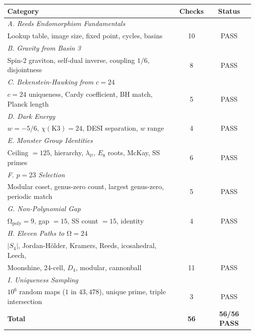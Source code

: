 \documentclass[12pt,a4paper]{article}
\theoremstyle{definition}\newtheorem{definition}[theorem]{Definition}
\theoremstyle{remark}\newtheorem{remark}[theorem]{Remark}
\renewcommand{\O}{\mathrm{\Omega}}
\newcommand{\Monster}{\mathbb{M}}\newcommand{\Leech}{\Lambda_{24}}
\begin{document}
\begin{center}
\small
\begin{tabular}{lcc}
\toprule
\textbf{Category} & \textbf{Checks} & \textbf{Status} \\
\midrule
\multicolumn{3}{l}{\emph{A. Reeds Endomorphism Fundamentals}} \\
\quad Lookup table, image size, fixed point, cycles, basins & 10 & \textcolor{proved}{PASS} \\
\midrule
\multicolumn{3}{l}{\emph{B. Gravity from Basin 3}} \\
\quad Spin-2 graviton, self-dual inverse, coupling $1/6$, disjointness & 8 & \textcolor{proved}{PASS} \\
\midrule
\multicolumn{3}{l}{\emph{C. Bekenstein-Hawking from $c = 24$}} \\
\quad $c = 24$ uniqueness, Cardy coefficient, BH match, Planck length & 5 & \textcolor{proved}{PASS} \\
\midrule
\multicolumn{3}{l}{\emph{D. Dark Energy}} \\
\quad $w = -5/6$, $\chi(\mathrm{K3}) = 24$, DESI separation, $w$ range & 4 & \textcolor{proved}{PASS} \\
\midrule
\multicolumn{3}{l}{\emph{E. Monster Group Identities}} \\
\quad Ceiling $= 125$, hierarchy, $\lambda_\Monster$, $E_8$ roots, McKay, SS primes & 6 & \textcolor{proved}{PASS} \\
\midrule
\multicolumn{3}{l}{\emph{F. $p = 23$ Selection}} \\
\quad Modular coset, genus-zero count, largest genus-zero, periodic match & 5 & \textcolor{proved}{PASS} \\
\midrule
\multicolumn{3}{l}{\emph{G. Non-Polynomial Gap}} \\
\quad $\O_{\mathrm{poly}} = 9$, gap $= 15$, SS count $= 15$, identity & 4 & \textcolor{proved}{PASS} \\
\midrule
\multicolumn{3}{l}{\emph{H. Eleven Paths to $\O = 24$}} \\
\quad $|S_4|$, Jordan-H\"older, Kramers, Reeds, icosahedral, Leech, & & \\
\quad Moonshine, 24-cell, $D_4$, modular, cannonball & 11 & \textcolor{proved}{PASS} \\
\midrule
\multicolumn{3}{l}{\emph{I. Uniqueness Sampling}} \\
\quad $10^6$ random maps ($1$ in $43{,}478$), unique prime, triple intersection & 3 & \textcolor{proved}{PASS} \\
\midrule
\textbf{Total} & \textbf{56} & \textbf{56/56 PASS} \\
\bottomrule
\end{tabular}
\end{center}
\end{document}
